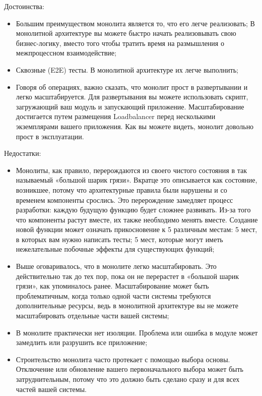 Достоинства:
\begin{itemize}
    \item Большим преимуществом монолита является то, что его легче реализовать;
    В монолитной архитектуре вы можете быстро начать реализовывать свою бизнес-логику, вместо того чтобы тратить время на размышления о межпроцессном взаимодействие;
    \item Сквозные (E2E) тесты. В монолитной архитектуре их легче выполнить;
    \item Говоря об операциях, важно сказать, что монолит прост в развертывании и легко масштабируется.
    Для развертывания вы можете использовать скрипт, загружающий ваш модуль и запускающий приложение. Масштабирование достигается путем размещения Loadbalancer перед несколькими экземплярами вашего приложения.
    Как вы можете видеть, монолит довольно прост в эксплуатации.
\end{itemize}
Недостатки:
\begin{itemize}
    \item Монолиты, как правило, перерождаются из своего чистого состояния в так называемый «большой шарик грязи».
    Вкратце это описывается как состояние, возникшее, потому что архитектурные правила были нарушены и со временем компоненты срослись.
    Это перерождение замедляет процесс разработки: каждую будущую функцию будет сложнее развивать.
    Из-за того что компоненты растут вместе, их также необходимо менять вместе.
    Создание новой функции может означать прикосновение к 5 различным местам: 5 мест, в которых вам нужно написать тесты; 5 мест, которые могут иметь нежелательные побочные эффекты для существующих функций;
    \item Выше оговаривалось, что в монолите легко масштабировать.
    Это действительно так до тех пор, пока он не перерастет в «большой шарик грязи», как упоминалось ранее.
    Масштабирование может быть проблематичным, когда только одной части системы требуются дополнительные ресурсы, ведь в монолитной архитектуре вы не можете масштабировать отдельные части вашей системы;
    \item В монолите практически нет изоляции.
    Проблема или ошибка в модуле может замедлить или разрушить все приложение;
    \item Строительство монолита часто протекает с помощью выбора основы.
    Отключение или обновление вашего первоначального выбора может быть затруднительным, потому что это должно быть сделано сразу и для всех частей вашей системы.
\end{itemize}
\bigbreak

